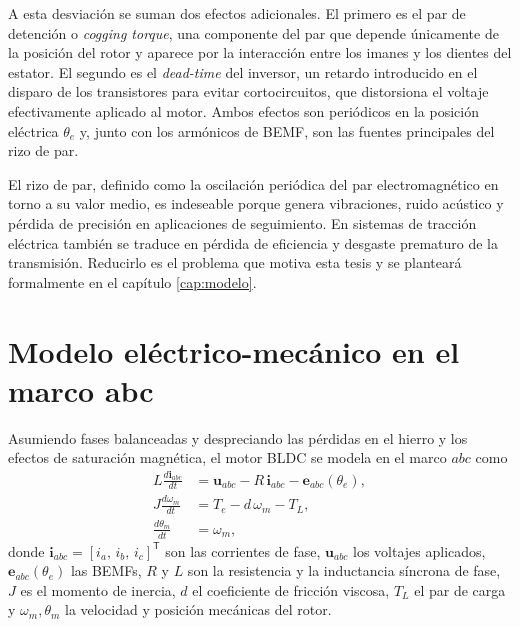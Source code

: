\documentclass[../../../Tesis_JALS_Maestria.tex]{subfiles}
\begin{document}
A esta desviación se suman dos efectos adicionales. El primero es el par de detención o \textit{cogging torque}, una componente del par que depende únicamente de la posición del rotor y aparece por la interacción entre los imanes y los dientes del estator. El segundo es el \textit{dead-time} del inversor, un retardo introducido en el disparo de los transistores para evitar cortocircuitos, que distorsiona el voltaje efectivamente aplicado al motor. Ambos efectos son periódicos en la posición eléctrica $\theta_e$ y, junto con los armónicos de BEMF, son las fuentes principales del rizo de par.

El rizo de par, definido como la oscilación periódica del par electromagnético en torno a su valor medio, es indeseable porque genera vibraciones, ruido acústico y pérdida de precisión en aplicaciones de seguimiento. En sistemas de tracción eléctrica también se traduce en pérdida de eficiencia y desgaste prematuro de la transmisión. Reducirlo es el problema que motiva esta tesis y se planteará formalmente en el capítulo \ref{cap:modelo}.

\section{Modelo eléctrico-mecánico en el marco abc}
\label{sec:modelo-abc}

Asumiendo fases balanceadas y despreciando las pérdidas en el hierro y los efectos de saturación magnética, el motor BLDC se modela en el marco $abc$ como \citep{pillay1989bldc, krause2013analysis, coronado2023}
\begin{subequations}
\label{eq:modelo-abc}
\begin{align}
    L \frac{d\mathbf{i}_{abc}}{dt} &= \mathbf{u}_{abc} - R\,\mathbf{i}_{abc} - \mathbf{e}_{abc}(\theta_e), \label{eq:modelo-abc-elec}\\
    J \frac{d\omega_m}{dt} &= T_e - d\,\omega_m - T_L, \label{eq:modelo-abc-mec}\\
    \frac{d\theta_m}{dt} &= \omega_m, \label{eq:modelo-abc-cin}
\end{align}
\end{subequations}
donde $\mathbf{i}_{abc} = [i_a,\,i_b,\,i_c]^{\mathsf T}$ son las corrientes de fase, $\mathbf{u}_{abc}$ los voltajes aplicados, $\mathbf{e}_{abc}(\theta_e)$ las BEMFs, $R$ y $L$ son la resistencia y la inductancia síncrona de fase, $J$ es el momento de inercia, $d$ el coeficiente de fricción viscosa, $T_L$ el par de carga y $\omega_m,\theta_m$ la velocidad y posición mecánicas del rotor.
\end{document}
